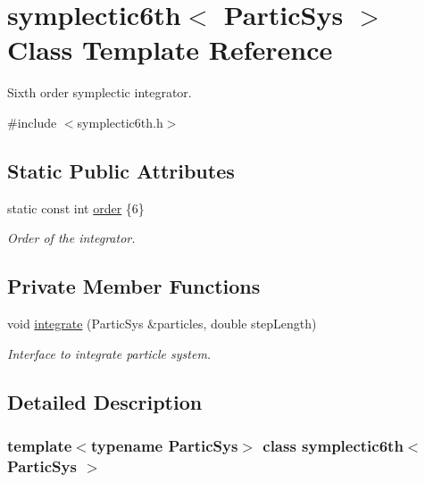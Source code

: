 \hypertarget{classsymplectic6th}{}\section{symplectic6th$<$ Partic\+Sys $>$ Class Template Reference}
\label{classsymplectic6th}


Sixth order symplectic integrator.  




{\ttfamily \#include $<$symplectic6th.\+h$>$}

\subsection*{Static Public Attributes}
\begin{DoxyCompactItemize}
\item 
static const int \mbox{\hyperlink{classsymplectic6th_a7f4232a8639d27aeb0890476176e8553}{order}} \{6\}
\begin{DoxyCompactList}\small\item\em Order of the integrator. \end{DoxyCompactList}\end{DoxyCompactItemize}
\subsection*{Private Member Functions}
\begin{DoxyCompactItemize}
\item 
void \mbox{\hyperlink{classsymplectic6th_a204014a9214f444e23a1a75cbbae2b86}{integrate}} (Partic\+Sys \&particles, double step\+Length)
\begin{DoxyCompactList}\small\item\em Interface to integrate particle system. \end{DoxyCompactList}\end{DoxyCompactItemize}


\subsection{Detailed Description}
\subsubsection*{template$<$typename Partic\+Sys$>$\newline
class symplectic6th$<$ Partic\+Sys $>$}


